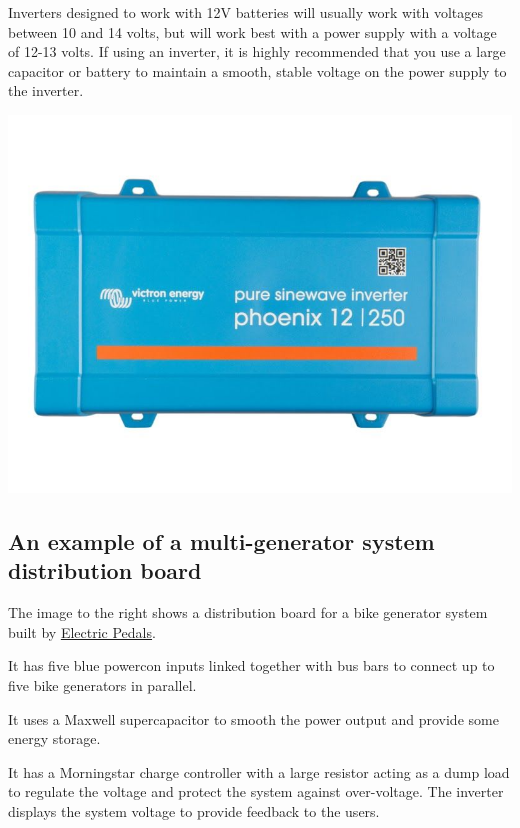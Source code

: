 \documentclass{article}
\theoremstyle{definition}
\theoremstyle{definition}
\theoremstyle{remark}
\begin{document}
    Inverters designed to work with 12V batteries will usually work with voltages between 10 and 14 volts, but will work best with a power supply with a voltage of 12-13 volts. If using an inverter, it is highly recommended that you use a large capacitor or battery to maintain a smooth, stable voltage on the power supply to the inverter.
  
    \begin{center}
      \includegraphics[width=0.15\paperwidth]{../Images/image_5_3_(inverter).png}
    \end{center}


  {\color{blue}\subsection{An example of a multi-generator system distribution board}} %
  \label{sub:an_example_of_a_multi_generator_system_distribution_board}

    The image to the right shows a distribution board for a bike generator system built by \href{https://www.electricpedals.com/}{\underline{Electric Pedals}}.

    It has five blue powercon inputs linked together with bus bars to connect up to five bike generators in parallel. 

    It uses a Maxwell supercapacitor to smooth the power output and provide some energy storage.

    It has a Morningstar charge controller with a large resistor acting as a dump load to regulate the voltage and protect the system against over-voltage. The inverter displays the system voltage to provide feedback to the users.
\end{document}
